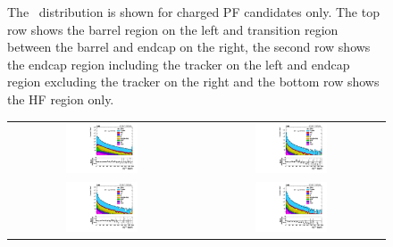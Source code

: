 \begin{figure}[!ht]
\begin{center}
\caption{The \MET\ distribution is shown for charged PF candidates only.
The top row shows the barrel region on the left and transition region between the barrel and endcap on the right,
the second row shows the endcap region including the tracker on the left and endcap region excluding the tracker on the right
and the bottom row shows the HF region only.
\label{fig:chpfcands}
}
\end{center}
\end{figure}

\begin{figure}[!ht]
\begin{center}
\begin{tabular}{cc}
\includegraphics[width=0.4\textwidth]{MET/figs/h_met_phpfcands_0013_pt_ll_signalregion_inclusive_passtrig.pdf} &
\includegraphics[width=0.4\textwidth]{MET/figs/h_met_phpfcands_1316_pt_ll_signalregion_inclusive_passtrig.pdf} \\
\includegraphics[width=0.4\textwidth]{MET/figs/h_met_phpfcands_1624_pt_ll_signalregion_inclusive_passtrig.pdf} &
\includegraphics[width=0.4\textwidth]{MET/figs/h_met_phpfcands_2430_pt_ll_signalregion_inclusive_passtrig.pdf} \\

\end{tabular}
\end{center}
\end{figure}
